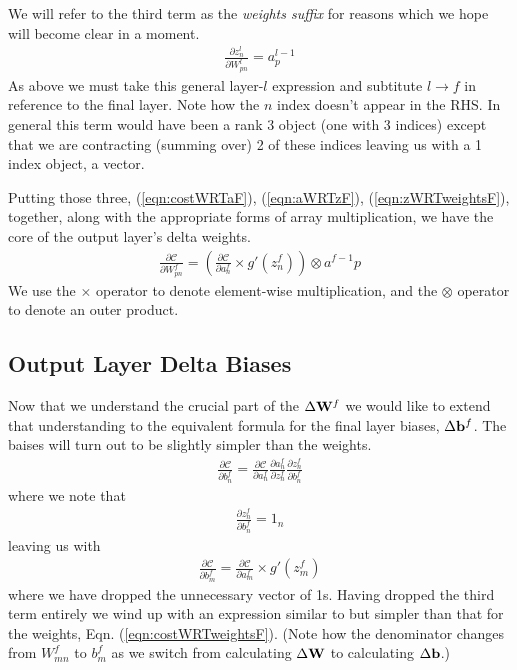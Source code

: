\documentclass[twocolumn]{revtex4-1}
\newcommand{\bld}[1]{\vectorbold{#1}}
\newcommand{\cC}{\mathscr{C}}
\newcommand{\parpar}[2]{\frac{\partial #1}{\partial #2}}
\begin{document}
We will refer to the third term as the \textit{weights suffix} for reasons which we hope will become clear in a moment.
\begin{align}
    \label{eqn:zWRTweightsL}
    \parpar{z^l_n}{W^l_{p n}} = a^{l-1}_p
\end{align}
As above we must take this general layer-$l$ expression and subtitute $l \rightarrow f$ in reference to the final layer. Note how the $n$ index doesn't appear in the RHS. In general this term would have been a rank 3 object (one with 3 indices) except that we are contracting (summing over) 2 of these indices leaving us with a 1 index object, a vector.

Putting those three, (\ref{eqn:costWRTaF}), (\ref{eqn:aWRTzF}), (\ref{eqn:zWRTweightsF}), together, along with the appropriate forms of array multiplication, we have the core of the output layer's delta weights.
\begin{align}
    \label{eqn:costWRTweightsF}
    \parpar{\cC}{W^f_{p n}} = \left(\parpar{\cC}{a^f_n} \times g'(z^f_n) \right) \otimes a^{f-1}{p}
\end{align}
We use the $\times$ operator to denote element-wise multiplication, and the $\otimes$ operator to denote an outer product.


\subsection{Output Layer Delta Biases}
Now that we understand the crucial part of the $\Delta \bld{W}^f$ we would like to extend that understanding to the equivalent formula for the final layer biases, $\Delta \bld{b}^f$. The baises will turn out to be slightly simpler than the weights.
\begin{align}
    \label{eqn:costWRTbiasesF}
    \parpar{\cC}{b^f_n} = \parpar{\cC}{a^f_n} \parpar{a^f_n}{z^f_n} \parpar{z^f_n}{b^f_n}
\end{align}
where we note that 
\begin{align*}
    \parpar{z^f_n}{b^f_n} = 1_n
\end{align*}
leaving us with
\begin{align}
    \parpar{\cC}{b^f_m} = \parpar{\cC}{a^f_m} \times g'(z^f_m)
\end{align}
where we have dropped the unnecessary vector of 1s. 
Having dropped the third term entirely we wind up with an expression similar to but simpler than that for the weights, Eqn. (\ref{eqn:costWRTweightsF}). (Note how the denominator changes from $W^f_{m n}$ to $b^f_m$ as we switch from calculating $\Delta \bld{W}$ to calculating $\Delta \bld{b}$.)
\end{document}

